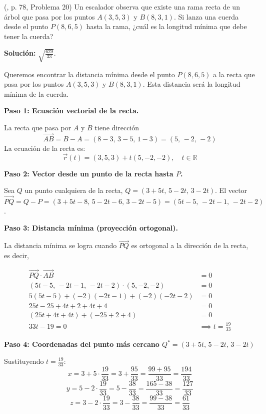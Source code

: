 \begin{prob} (\cite{espinoza2006Algebralineal}, p. 78, Problema 20) Un escalador observa que existe una rama recta de un árbol que pasa por los puntos $A(3,5,3)$ y $B(8,3,1)$. Si lanza una cuerda desde el punto $P(8,6,5)$ hasta la rama, ¿cuál es la longitud mínima que debe tener la cuerda? 

\textbf{Solución:} $\sqrt{\frac{629}{33}}$.

\begin{myproof}
Queremos encontrar la distancia mínima desde el punto $P(8,6,5)$ a la recta que pasa por los puntos $A(3,5,3)$ y $B(8,3,1)$. Esta distancia será la longitud mínima de la cuerda.

\textbf{Paso 1: Ecuación vectorial de la recta.}

La recta que pasa por $A$ y $B$ tiene dirección
\[
\overrightarrow{AB} = B - A = (8-3,\, 3-5,\, 1-3) = (5,\,-2,\,-2)
\]
La ecuación de la recta es:
\[
\overrightarrow{r}(t) = (3,5,3) + t(5,-2,-2), \quad t \in \mathbb{R}
\]

\textbf{Paso 2: Vector desde un punto de la recta hasta $P$.}

Sea $Q$ un punto cualquiera de la recta, $Q = (3+5t,\, 5-2t,\, 3-2t)$.  
El vector $\overrightarrow{PQ} = Q - P = (3+5t-8,\, 5-2t-6,\, 3-2t-5) = (5t-5,\, -2t-1,\, -2t-2)$.

\textbf{Paso 3: Distancia mínima (proyección ortogonal).}

La distancia mínima se logra cuando $\overrightarrow{PQ}$ es ortogonal a la dirección de la recta, es decir,

\begin{align*}
\overrightarrow{PQ} \cdot \overrightarrow{AB} &= 0\\
(5t-5,\, -2t-1,\, -2t-2) \cdot (5, -2, -2) &= 0\\
5(5t-5) + (-2)(-2t-1) + (-2)(-2t-2) &= 0\\
25t - 25 + 4t + 2 + 4t + 4 &= 0\\
(25t + 4t + 4t) + (-25 + 2 + 4) &= 0\\
33t - 19 = 0 &\implies t = \frac{19}{33}
\end{align*}



\textbf{Paso 4: Coordenadas del punto más cercano $Q^*=(3 + 5t,\, 5 - 2t,\, 3 - 2t)$}

Sustituyendo $t = \frac{19}{33}$:
\[
x = 3 + 5 \cdot \frac{19}{33} = 3 + \frac{95}{33} = \frac{99 + 95}{33} = \frac{194}{33}
\]
\[
y = 5 - 2 \cdot \frac{19}{33} = 5 - \frac{38}{33} = \frac{165 - 38}{33} = \frac{127}{33}
\]
\[
z = 3 - 2 \cdot \frac{19}{33} = 3 - \frac{38}{33} = \frac{99 - 38}{33} = \frac{61}{33}
\]


\end{myproof}
\end{prob}

